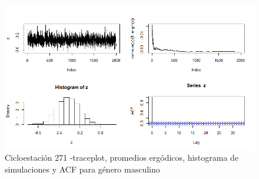 \documentclass[9pt,twocolumn,twoside]{ilcss}
\begin{document}
\begin{appendices}
\begin{figure}[tbhp]
	\centering
	\includegraphics[width=0.9\linewidth]{Paper/images/271_genero_2hombre.png}
	\caption{ Cicloestación 271 -traceplot, promedios ergódicos, histograma de simulaciones y ACF para género masculino}
	\label{fig:pen_habs_penbc271_hombre}
\end{figure}


\end{appendices}
\end{document}
